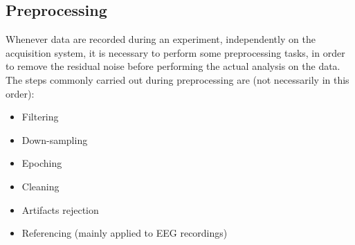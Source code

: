 \subsection{Preprocessing}
Whenever data are recorded during an experiment, independently on the acquisition
system, it is necessary to perform some preprocessing tasks, in order to
remove the residual noise before performing the actual analysis on the data.\\
The steps commonly carried out during preprocessing are (not necessarily in this order):
\begin{itemize}
    \item Filtering
    \item Down-sampling
    \item Epoching
    \item Cleaning
    \item Artifacts rejection
    \item Referencing (mainly applied to EEG recordings)
\end{itemize}
